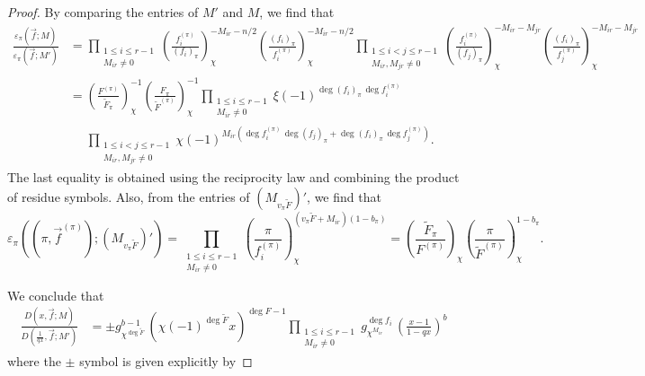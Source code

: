 \documentclass[11pt,letterpaper]{article}
\theoremstyle{definition}
\theoremstyle{remark}
\numberwithin{equation}{section}
\theoremstyle{dotless}
\newcommand{\res}[2]{\left(\frac{#1}{#2}\right)}
\renewcommand{\tilde}{\widetilde}
\begin{document}
\begin{proof}
By comparing the entries of $M'$ and $M$, we find that
\begin{equation*}
\begin{split}
\frac{\varepsilon_\pi(\vec{f}; M)}{\varepsilon_\pi(\vec{f}; M')} &= \prod_{\substack{1 \leq i \leq r-1 \\ M_{ir} \neq 0}} \res{f_i^{(\pi)}}{(f_i)_\pi}_{\chi}^{-M_{ir}-n/2} \res{(f_i)_\pi}{f_i^{(\pi)}}_{\chi}^{-M_{ir}-n/2} \prod_{\substack{1 \leq i<j \leq r-1 \\ M_{ir}, M_{jr} \neq 0}} \res{f_i^{(\pi)}}{(f_j)_\pi}_{\chi}^{-M_{ir}-M_{jr}} \res{(f_i)_\pi}{f_j^{(\pi)}}_{\chi}^{-M_{ir}-M_{jr}} \\
&=  \res{F^{(\pi)}}{\tilde{F}_\pi}_\chi^{-1} \res{F_\pi}{ \tilde{F}^{(\pi)}}_\chi^{-1} \prod_{\substack{1 \leq i \leq r-1 \\ M_{ir} \neq 0}} \xi(-1)^{\deg (f_i)_\pi \, \deg f_i^{(\pi)}} \\
&\phantom{=} \prod_{\substack{1 \leq i<j \leq r-1 \\ M_{ir}, M_{jr} \neq 0}} \chi(-1)^{M_{ir}(\deg f_i^{(\pi)} \,\deg (f_j)_\pi + \deg (f_i)_{\pi} \,\deg f_j^{(\pi)})}.
\end{split}
\end{equation*}
The last equality is obtained using the reciprocity law and combining the product of residue symbols. Also, from the entries of $(M_{v_\pi\tilde{F}})'$, we find that 
\begin{equation*}
\varepsilon_\pi((\pi, \vec{f}^{(\pi)}); (M_{v_\pi\tilde{F}})')=\prod_{\substack{1 \leq i \leq r-1 \\ M_{ir} \neq 0}} \res{\pi}{f_i^{(\pi)}}_\chi^{(v_\pi \tilde{F} + M_{ir})(1-b_\pi)} = \res{\tilde{F}_\pi}{F^{(\pi)}}_\chi \res{\pi}{\tilde{F}^{(\pi)}}_\chi^{1-b_\pi}.
\end{equation*}

We conclude that 
\begin{equation*}
\begin{split}
\frac{D(x, \vec{f}; M)} {D\left(\frac{1}{qx}, \vec{f}; M'\right)} &=\pm g_{\chi^{\deg \tilde{F}}} ^{b-1} \, (\chi(-1)^{\deg \tilde{F}} x)^{\deg F-1} \prod_{\substack{1 \leq i \leq r-1 \\ M_{ir} \neq 0}} g_{\chi^{M_{ir}}} ^{\deg f_i} \, \left( \frac{x-1}{1-qx}\right)^b
\end{split}
\end{equation*}
where the $\pm$ symbol is given explicitly by


\end{proof}
\end{document}
